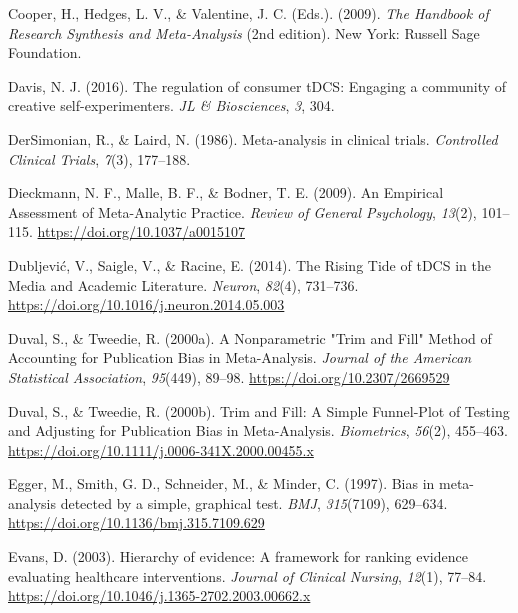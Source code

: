 \documentclass[
  man,floatsintext]{apa6}
\newlength{\cslhangindent}
\newlength{\cslentryspacingunit} %
\newenvironment{CSLReferences}[2] %
 {%
  \setlength{\parindent}{0pt}
  \ifodd #1
  \let\oldpar\par
  \def\par{\hangindent=\cslhangindent\oldpar}
  \fi
  \setlength{\parskip}{#2\cslentryspacingunit}
 }%
 {}
\begin{document}
\begin{CSLReferences}{1}{0}
\leavevmode{}%
Cooper, H., Hedges, L. V., \& Valentine, J. C. (Eds.). (2009). \emph{The {Handbook} of {Research Synthesis} and {Meta-Analysis}} (2nd edition). {New York}: {Russell Sage Foundation}.

\leavevmode{}%
Davis, N. J. (2016). The regulation of consumer {tDCS}: Engaging a community of creative self-experimenters. \emph{JL \& Biosciences}, \emph{3}, 304.

\leavevmode{}%
DerSimonian, R., \& Laird, N. (1986). Meta-analysis in clinical trials. \emph{Controlled Clinical Trials}, \emph{7}(3), 177--188.

\leavevmode{}%
Dieckmann, N. F., Malle, B. F., \& Bodner, T. E. (2009). An {Empirical Assessment} of {Meta-Analytic Practice}. \emph{Review of General Psychology}, \emph{13}(2), 101--115. \url{https://doi.org/10.1037/a0015107}

\leavevmode{}%
Dubljević, V., Saigle, V., \& Racine, E. (2014). The {Rising Tide} of {tDCS} in the {Media} and {Academic Literature}. \emph{Neuron}, \emph{82}(4), 731--736. \url{https://doi.org/10.1016/j.neuron.2014.05.003}

\leavevmode{}%
Duval, S., \& Tweedie, R. (2000a). A {Nonparametric} "{Trim} and {Fill}" {Method} of {Accounting} for {Publication Bias} in {Meta-Analysis}. \emph{Journal of the American Statistical Association}, \emph{95}(449), 89--98. \url{https://doi.org/10.2307/2669529}

\leavevmode{}%
Duval, S., \& Tweedie, R. (2000b). Trim and {Fill}: {A Simple Funnel-Plot} of {Testing} and {Adjusting} for {Publication Bias} in {Meta-Analysis}. \emph{Biometrics}, \emph{56}(2), 455--463. \url{https://doi.org/10.1111/j.0006-341X.2000.00455.x}

\leavevmode{}%
Egger, M., Smith, G. D., Schneider, M., \& Minder, C. (1997). Bias in meta-analysis detected by a simple, graphical test. \emph{BMJ}, \emph{315}(7109), 629--634. \url{https://doi.org/10.1136/bmj.315.7109.629}

\leavevmode{}%
Evans, D. (2003). Hierarchy of evidence: A framework for ranking evidence evaluating healthcare interventions. \emph{Journal of Clinical Nursing}, \emph{12}(1), 77--84. \url{https://doi.org/10.1046/j.1365-2702.2003.00662.x}


\end{CSLReferences}
\end{document}
